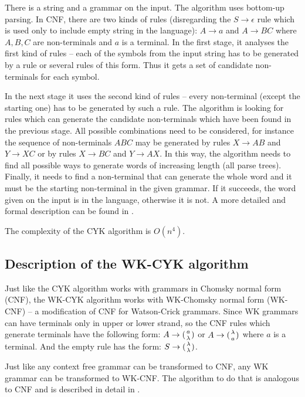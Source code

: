 There is a string and a grammar on the input. The algorithm uses bottom-up parsing. In CNF, there are two kinds of rules (disregarding the $S \rightarrow \epsilon$ rule which is used only to include empty string in the language): $A \rightarrow a$ and $A \rightarrow BC$ where $A, B, C$ are non-terminals and $a$ is a terminal. In the first stage, it analyses the first kind of rules -- each of the symbols from the input string has to be generated by a rule or several rules of this form. Thus it gets a set of candidate non-terminals for each symbol.

In the next stage it uses the second kind of rules -- every non-terminal (except the starting one) has to be generated by such a rule. The algorithm is looking for rules which can generate the candidate non-terminals which have been found in the previous stage. All possible combinations need to be considered, for instance the sequence of non-terminals $ABC$ may be generated by rules $X \rightarrow AB$ and $Y \rightarrow XC$ or by rules $X \rightarrow BC$ and $Y \rightarrow AX$. In this way, the algorithm needs to find all possible ways to generate words of increasing length (all parse trees). Finally, it needs to find a non-terminal that can generate the whole word and it must be the starting non-terminal in the given grammar. If it succeeds, the word given on the input is in the language, otherwise it is not.
A more detailed and formal description can be found in .

The complexity of the CYK algorithm is $O(n^4)$.


\subsection{Description of the WK-CYK algorithm}
Just like the CYK algorithm works with grammars in Chomsky normal form (CNF), the WK-CYK algorithm works with WK-Chomsky normal form (WK-CNF) -- a modification of CNF for Watson-Crick grammars. Since WK grammars can have terminals only in upper or lower strand, so the CNF rules which generate terminals have the following form: $A \rightarrow ({a \atop \lambda})$ or $A \rightarrow ({\lambda \atop a})$ where $a$ is a terminal. And the empty rule has the form: $S \rightarrow ({\lambda \atop \lambda})$.

Just like any context free grammar can be transformed to CNF, any WK grammar can be transformed to WK-CNF. The algorithm to do that is analogous to CNF and is described in detail in \cite{WK_CYK}.

